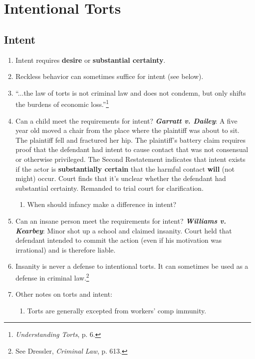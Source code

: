 \section{Intentional Torts}

\subsection{Intent}

\begin{enumerate}
    \item Intent requires \textbf{desire} or \textbf{substantial certainty}.
    \item Reckless behavior can sometimes suffice for intent (see below). %
    \item ``...the law of torts is not criminal law and does not condemn, but only shifts the burdens of economic loss.''\footnote{\emph{Understanding Torts}, p. 6.}
    \item Can a child meet the requirements for intent? \textbf{\emph{Garratt v. Dailey}}: A five year old moved a chair from the place where the plaintiff was about to sit. The plaintiff fell and fractured her hip. The plaintiff's battery claim requires proof that the defendant had intent to cause contact that was not consensual or otherwise privileged. The Second Restatement indicates that intent exists if the actor is \textbf{substantially certain} that the harmful contact \textbf{will} (not might) occur. Court finds that it's unclear whether the defendant had substantial certainty. Remanded to trial court for clarification.
        \begin{enumerate}
            \item When should infancy make a difference in intent?
        \end{enumerate}
    \item Can an insane person meet the requirements for intent? \textbf{\emph{Williams v. Kearbey}}: Minor shot up a school and claimed insanity. Court held that defendant intended to commit the action (even if his motivation was irrational) and is therefore liable.
        \item Insanity is never a defense to intentional torts. It can sometimes be used as a defense in criminal law.\footnote{See Dressler, \emph{Criminal Law}, p. 613.}
    \item Other notes on torts and intent:
    \begin{enumerate}
        \item Torts are generally excepted from workers' comp immunity.

\end{enumerate}
\end{enumerate}
